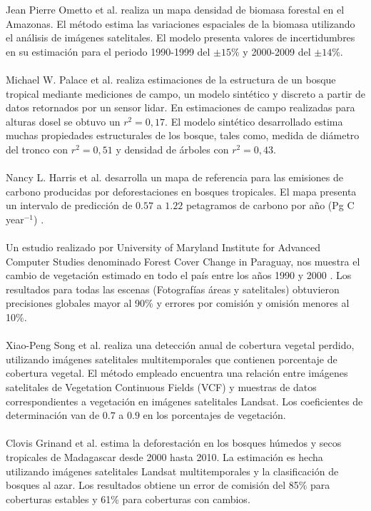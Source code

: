 Jean Pierre Ometto et al. \cite{ometto2015amazon} realiza un mapa densidad de biomasa forestal en el Amazonas. El m\'etodo estima las variaciones espaciales de la biomasa utilizando el an\'alisis de im\'agenes satelitales. El modelo presenta valores de incertidumbres en su estimaci\'on para el periodo 1990-1999 del $ \pm 15\% $ y 2000-2009 del $ \pm 14\% $.\\~\\
Michael W. Palace et al. \cite{palace2015estimating} realiza estimaciones de la estructura de un bosque tropical mediante mediciones de campo, un modelo sint\'etico y  discreto a partir de datos retornados por un sensor lidar. En estimaciones de campo realizadas para alturas dosel se obtuvo un $ r^{2}=0,17 $. El modelo sint\'etico desarrollado estima muchas propiedades estructurales de los bosque, tales como, medida de di\'ametro del tronco con $ r^{2}=0,51 $ y densidad de \'arboles con $ r^{2}=0,43 $.\\~\\
Nancy L. Harris et al. \cite{harris2012baseline} desarrolla un mapa de referencia para las emisiones de carbono producidas por deforestaciones en bosques tropicales. El mapa presenta un intervalo de predicci\'on de $ 0.57 $ a $ 1.22 $ petagramos de carbono por a\~{n}o (Pg C year$ ^{-1} $) .\\~\\
Un estudio realizado por University of Maryland Institute for Advanced Computer Studies denominado Forest Cover Change in Paraguay, nos muestra el cambio de vegetaci\'on estimado en todo el pa\'is entre los a\~{n}os 1990 y 2000 \cite{huang2009assessment}. Los resultados para todas las escenas (Fotograf\'ias \'areas y satelitales) obtuvieron precisiones globales mayor al 90\% y errores por comisi\'on y omisi\'on menores al 10\%.\\~\\
Xiao-Peng Song et al. \cite{song2014annual} realiza una detecci\'on anual de cobertura vegetal perdido, utilizando im\'agenes satelitales multitemporales que contienen porcentaje de cobertura vegetal. El m\'etodo empleado encuentra una relaci\'on entre im\'agenes satelitales de Vegetation Continuous Fields (VCF) y muestras de datos correspondientes a vegetaci\'on en im\'agenes satelitales Landsat. Los coeficientes de determinaci\'on van de $ 0.7 $ a $ 0.9 $ en los porcentajes de vegetaci\'on.\\~\\
Clovis Grinand et al. \cite{grinand2013estimating} estima la deforestaci\'on en los bosques h\'umedos y secos tropicales de Madagascar desde 2000 hasta 2010. La estimaci\'on es hecha utilizando im\'agenes satelitales Landsat multitemporales y la clasificaci\'on de bosques al azar. Los resultados obtiene un error de comisi\'on del 85\% para coberturas estables y 61\% para coberturas con cambios.\\~\\

